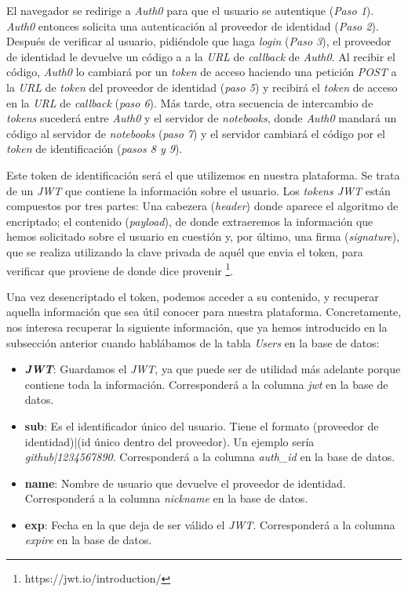 \documentclass[11pt,spanish,listoffigures,listoftables]{tfgetsinf}
\begin{document}
El navegador se redirige a \textit{Auth0} para que el usuario se autentique (\textit{Paso 1}). \textit{Auth0} entonces solicita una autenticación al proveedor de identidad (\textit{Paso 2}). Después de verificar al usuario, pidiéndole que haga \textit{login} (\textit{Paso 3}), el proveedor de identidad le devuelve un código a a la \textit{URL} de \textit{callback} de \textit{Auth0}. Al recibir el código, \textit{Auth0} lo cambiará por un \textit{token} de acceso haciendo una petición \textit{POST} a la \textit{URL} de \textit{token} del proveedor de identidad (\textit{paso 5}) y recibirá el \textit{token} de acceso en la \textit{URL} de \textit{callback} (\textit{paso 6}). Más tarde, otra secuencia de intercambio de \textit{tokens} sucederá entre \textit{Auth0} y el servidor de \textit{notebooks}, donde \textit{Auth0} mandará un código al servidor de \textit{notebooks} (\textit{paso 7}) y el servidor cambiará el código por el \textit{token} de identificación (\textit{pasos 8 y 9}).

Este token de identificación será el que utilizemos en nuestra plataforma. Se trata de un \textit{JWT} que contiene la información sobre el usuario. Los \textit{tokens JWT} están compuestos por tres partes: Una cabezera (\textit{header}) donde aparece el algoritmo de encriptado; el contenido (\textit{payload}), de donde extraeremos la información que hemos solicitado sobre el usuario en cuestión y, por último, una firma (\textit{signature}), que se realiza utilizando la clave privada de aquél que envia el token, para verificar que proviene de donde dice provenir \footnote{https://jwt.io/introduction/}.

Una vez desencriptado el token, podemos acceder a su contenido, y recuperar aquella información que sea útil conocer para nuestra plataforma. Concretamente, nos interesa recuperar la siguiente información, que ya hemos introducido en la subsección anterior cuando hablábamos de la tabla \textit{Users} en la base de datos:

\begin{itemize}

\item \textbf{\textit{JWT}}: Guardamos el \textit{JWT}, ya que puede ser de utilidad más adelante porque contiene toda la información. Corresponderá a la columna \textit{jwt} en la base de datos.

\item \textbf{sub}: Es el identificador único del usuario. Tiene el formato (proveedor de identidad)|(id único dentro del proveedor). Un ejemplo sería \textit{github|1234567890}. Corresponderá a la columna \textit{auth\_id} en la base de datos.

\item \textbf{name}: Nombre de usuario que devuelve el proveedor de identidad. Corresponderá a la columna \textit{nickname} en la base de datos.

\item \textbf{exp}: Fecha en la que deja de ser válido el \textit{JWT}. Corresponderá a la columna \textit{expire} en la base de datos.

\end{itemize}
\end{document}
